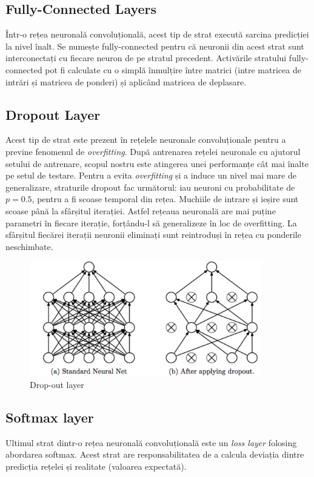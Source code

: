 \subsection{Fully-Connected Layers}
Într-o rețea neuronală convoluțională, acest tip de strat execută sarcina predicției la nivel înalt. Se numește fully-connected pentru că neuronii din acest strat sunt interconectați cu fiecare neuron de pe stratul precedent.\newline
Activările stratului fully-connected pot fi calculate cu o simplă înmulțire între matrici (intre matricea de intrări și matricea de ponderi) și aplicând matricea de deplasare.

\subsection{Dropout Layer}
Acest tip de strat este prezent în rețelele neuronale convoluționale pentru a previne fenomenul de \textit{overfitting}. După antrenarea rețelei neuronale cu ajutorul setului de antrenare, scopul nostru este atingerea unei performanțe cât mai înalte pe setul de testare. Pentru a evita \textit{overfitting} și a induce un nivel mai mare de generalizare, straturile dropout fac următorul: iau neuroni cu probabilitate de $p=0.5$, pentru a fi scoase temporal din rețea. Muchiile de intrare și ieșire sunt scoase până la sfârșitul iterației.\newline
Astfel rețeaua neuronală are mai puține parametri în fiecare iterație, forțându-l să generalizeze în loc de overfitting. La sfârșitul fiecărei iterații neuronii eliminați sunt reintroduși în rețea cu ponderile neschimbate.

\begin{figure}[h!]
    	\centering
	\captionsetup{justification=centering, margin=2cm}
	\includegraphics[width=0.9\textwidth]{figures/dro_out_lay.png}
	\caption{Drop-out layer \cite{dro_out_lay}}
	\label{fig:drop-out layer}
\end{figure}

\subsection{Softmax layer}
Ultimul strat dintr-o rețea neuronală convoluțională este un \textit{loss layer} folosing abordarea softmax.\newline
Acest strat are responsabilitatea de a calcula deviația dintre predicția rețelei și realitate (valoarea expectată). 


\label{cap:fund-teoretice}